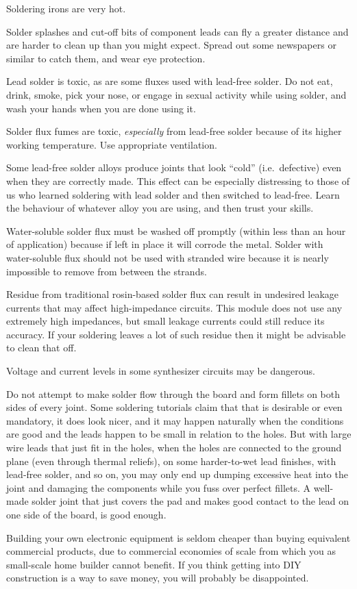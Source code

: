 Soldering irons are very hot.

Solder splashes and cut-off bits of component leads can fly a greater
distance and are harder to clean up than you might expect.  Spread out some
newspapers or similar to catch them, and wear eye protection.

Lead solder is toxic, as are some fluxes used with lead-free solder.  Do not
eat, drink, smoke, pick your nose, or engage in sexual activity while using
solder, and wash your hands when you are done using it.

Solder flux fumes are toxic, \emph{especially} from lead-free solder
because of its higher working temperature.  Use appropriate ventilation.

Some lead-free solder alloys produce joints that look ``cold''
(i.e.\ defective) even when they are correctly made.  This effect can be
especially distressing to those of us who learned soldering with lead solder
and then switched to lead-free.  Learn the behaviour of whatever alloy you  
are using, and then trust your skills.

Water-soluble solder flux must be washed off promptly (within less than an
hour of application) because if left in place it will corrode the metal. 
Solder with water-soluble flux should not be used with stranded wire because
it is nearly impossible to remove from between the strands.

Residue from traditional rosin-based solder flux can result in undesired
leakage currents that may affect high-impedance circuits.  This module does
not use any extremely high impedances, but small leakage currents could
still reduce its accuracy.  If your soldering leaves a lot of such
residue then it might be advisable to clean that off.

Voltage and current levels in some synthesizer circuits may be dangerous.

Do not attempt to make solder flow through the board and form fillets on
both sides of every joint.  Some soldering tutorials claim that that is
desirable or even mandatory, it does look nicer, and it may happen naturally
when the conditions are good and the leads happen to be small in relation to
the holes.  But with large wire leads that just fit in the holes, when the
holes are connected to the ground plane (even through thermal reliefs), on
some harder-to-wet lead finishes, with lead-free solder, and so on, you may
only end up dumping excessive heat into the joint and damaging the
components while you fuss over perfect fillets.  A well-made solder joint
that just covers the pad and makes good contact to the lead on one side of
the board, is good enough.

Building your own electronic equipment is seldom cheaper than buying
equivalent commercial products, due to commercial economies of scale from
which you as small-scale home builder cannot benefit.  If you think getting
into DIY construction is a way to save money, you will probably be
disappointed.
